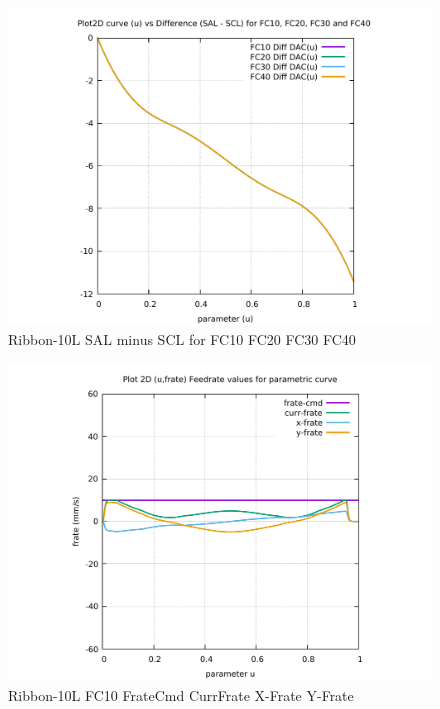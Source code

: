 \begin{figure}
	\caption     {Ribbon-10L SAL minus SCL for FC10 FC20 FC30 FC40}
	\label{26-img-Ribbon-10L-SAL-minus-SCL-for-FC10-FC20-FC30-FC40.pdf}
\includegraphics[width=1.00\textwidth]{Chap4/appendix/app-Ribbon-10L/plots/26-img-Ribbon-10L-Difference-SAL-minus-SCL-for-FC10-FC20-FC30-FC40.pdf}
\end{figure}


\clearpage
\pagebreak

\begin{figure}
	\caption     {Ribbon-10L FC10 FrateCmd CurrFrate X-Frate Y-Frate}
	\label{27-img-Ribbon-10L-FC10-FrateCmd-CurrFrate-X-Frate-Y-Frate.pdf}
\includegraphics[width=1.00\textwidth]{Chap4/appendix/app-Ribbon-10L/plots/27-img-Ribbon-10L-FC10-FrateCmd-CurrFrate-X-Frate-Y-Frate.pdf}
\end{figure}


